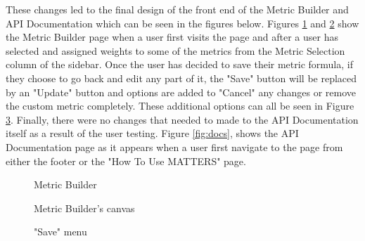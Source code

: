 		These changes led to the final design of the front end of the Metric Builder 
		and API Documentation which can be seen in the figures below. Figures \ref{fig:mb} and \ref{fig:inuse} show the Metric Builder page when a user first visits 
		the page and after a user has selected and assigned weights to some of the metrics from the Metric Selection column of the sidebar. Once the user has decided to save their metric formula, 
		if they choose to go back and edit any part of it, the "Save" button will be replaced by an "Update" button and options are added to "Cancel" any changes or remove the custom metric completely. 
		These additional options can all be seen in Figure \ref{fig:save}. Finally, there were no changes that needed to made to the API Documentation itself as a result of the user testing. 
		Figure \ref{fig:docs}, shows the API Documentation page as it appears when a user first navigate to the page from either the footer or the "How To Use MATTERS" page.

			\begin{figure}[t]
				\centering
					\caption{Metric Builder}
					\label{fig:mb}
			\end{figure}
			
			\begin{figure}[t]
				\centering
					\caption{Metric Builder's canvas}
					\label{fig:inuse}
			\end{figure}
			
			\begin{figure}[t]
				\centering
					\caption{"Save" menu}
					\label{fig:save}
			\end{figure}
			
